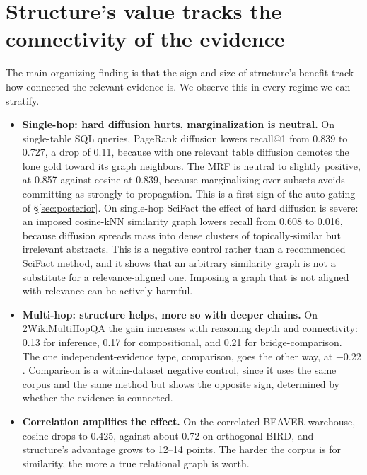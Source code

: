 \documentclass[11pt]{article}
\begin{document}
\section{Structure's value tracks the connectivity of the evidence}\label{sec:boundary}

The main organizing finding is that the sign and size of structure's benefit track how connected the
relevant evidence is. We observe this in every regime we can stratify.

\begin{itemize}[leftmargin=1.4em,itemsep=2pt]
\item \textbf{Single-hop: hard diffusion hurts, marginalization is neutral.} On single-table SQL
queries, PageRank diffusion lowers recall@1 from 0.839 to 0.727, a drop of 0.11, because with one
relevant table diffusion demotes the lone gold toward its graph neighbors. The MRF is neutral to
slightly positive, at 0.857 against cosine at 0.839, because marginalizing over subsets avoids
committing as strongly to propagation. This is a first sign of the auto-gating of \S\ref{sec:posterior}.
On single-hop SciFact the effect of hard diffusion is severe: an imposed cosine-kNN similarity graph
lowers recall from 0.608 to 0.016, because diffusion spreads mass into dense clusters of
topically-similar but irrelevant abstracts. This is a negative control rather than a recommended
SciFact method, and it shows that an arbitrary similarity graph is not a substitute for a
relevance-aligned one. Imposing a graph that is not aligned with relevance can be actively harmful.
\item \textbf{Multi-hop: structure helps, more so with deeper chains.} On 2WikiMultiHopQA the gain
increases with reasoning depth and connectivity: 0.13 for inference, 0.17 for compositional, and 0.21
for bridge-comparison. The one independent-evidence type, comparison, goes the other way, at $-0.22$.
Comparison is a within-dataset negative control, since it uses the same corpus and the same method but
shows the opposite sign, determined by whether the evidence is connected.
\item \textbf{Correlation amplifies the effect.} On the correlated BEAVER warehouse, cosine drops to
0.425, against about 0.72 on orthogonal BIRD, and structure's advantage grows to 12--14 points. The
harder the corpus is for similarity, the more a true relational graph is worth.
\end{itemize}
\end{document}

